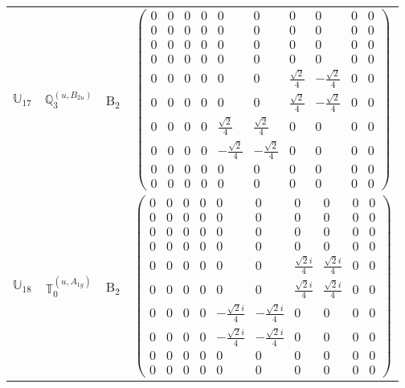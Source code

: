 \documentclass[fleqn,10pt,landscape]{article}
\begin{document}
\begin{itemize}
\begin{center}
\begin{longtable}{c|c|c|c}
$ \mathbb{U}_{17} $ & $\mathbb{Q}_{3}^{(u,B_{2u})}$ & B$_{2}$ & $\begin{pmatrix} 0 & 0 & 0 & 0 & 0 & 0 & 0 & 0 & 0 & 0 \\ 0 & 0 & 0 & 0 & 0 & 0 & 0 & 0 & 0 & 0 \\ 0 & 0 & 0 & 0 & 0 & 0 & 0 & 0 & 0 & 0 \\ 0 & 0 & 0 & 0 & 0 & 0 & 0 & 0 & 0 & 0 \\ 0 & 0 & 0 & 0 & 0 & 0 & \frac{\sqrt{2}}{4} & - \frac{\sqrt{2}}{4} & 0 & 0 \\ 0 & 0 & 0 & 0 & 0 & 0 & \frac{\sqrt{2}}{4} & - \frac{\sqrt{2}}{4} & 0 & 0 \\ 0 & 0 & 0 & 0 & \frac{\sqrt{2}}{4} & \frac{\sqrt{2}}{4} & 0 & 0 & 0 & 0 \\ 0 & 0 & 0 & 0 & - \frac{\sqrt{2}}{4} & - \frac{\sqrt{2}}{4} & 0 & 0 & 0 & 0 \\ 0 & 0 & 0 & 0 & 0 & 0 & 0 & 0 & 0 & 0 \\ 0 & 0 & 0 & 0 & 0 & 0 & 0 & 0 & 0 & 0 \end{pmatrix}$ \\
$ \mathbb{U}_{18} $ & $\mathbb{T}_{0}^{(u,A_{1g})}$ & B$_{2}$ & $\begin{pmatrix} 0 & 0 & 0 & 0 & 0 & 0 & 0 & 0 & 0 & 0 \\ 0 & 0 & 0 & 0 & 0 & 0 & 0 & 0 & 0 & 0 \\ 0 & 0 & 0 & 0 & 0 & 0 & 0 & 0 & 0 & 0 \\ 0 & 0 & 0 & 0 & 0 & 0 & 0 & 0 & 0 & 0 \\ 0 & 0 & 0 & 0 & 0 & 0 & \frac{\sqrt{2} i}{4} & \frac{\sqrt{2} i}{4} & 0 & 0 \\ 0 & 0 & 0 & 0 & 0 & 0 & \frac{\sqrt{2} i}{4} & \frac{\sqrt{2} i}{4} & 0 & 0 \\ 0 & 0 & 0 & 0 & - \frac{\sqrt{2} i}{4} & - \frac{\sqrt{2} i}{4} & 0 & 0 & 0 & 0 \\ 0 & 0 & 0 & 0 & - \frac{\sqrt{2} i}{4} & - \frac{\sqrt{2} i}{4} & 0 & 0 & 0 & 0 \\ 0 & 0 & 0 & 0 & 0 & 0 & 0 & 0 & 0 & 0 \\ 0 & 0 & 0 & 0 & 0 & 0 & 0 & 0 & 0 & 0 \end{pmatrix}$ \\

\end{longtable}
\end{center}
\end{itemize}
\end{document}
